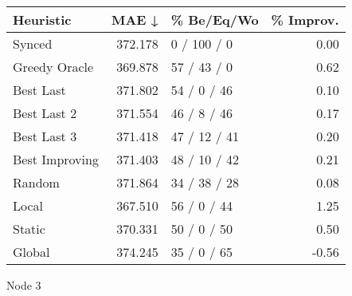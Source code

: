 \begin{tabular}{lrlr}
\toprule
\textbf{Heuristic} & \textbf{MAE ↓} & \textbf{\% Be/Eq/Wo} & \textbf{\% Improv.} \\
\midrule
            Synced &        372.178 &          0 / 100 / 0 &                0.00 \\
     Greedy Oracle &        369.878 &          57 / 43 / 0 &                0.62 \\
         Best Last &        371.802 &          54 / 0 / 46 &                0.10 \\
       Best Last 2 &        371.554 &          46 / 8 / 46 &                0.17 \\
       Best Last 3 &        371.418 &         47 / 12 / 41 &                0.20 \\
    Best Improving &        371.403 &         48 / 10 / 42 &                0.21 \\
            Random &        371.864 &         34 / 38 / 28 &                0.08 \\
             Local &        367.510 &          56 / 0 / 44 &                1.25 \\
            Static &        370.331 &          50 / 0 / 50 &                0.50 \\
            Global &        374.245 &          35 / 0 / 65 &               -0.56 \\
\bottomrule
\end{tabular}
\caption{Node 3}
\label{tab:non_lr01_le2_bs2_3}
